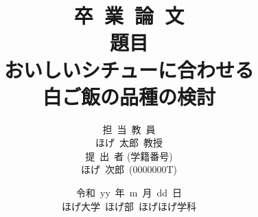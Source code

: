 \title{{\Huge 卒~業~論~文} \\
\vspace{2cm} 題\hspace{1cm}目 \\
\vspace{0.3cm}おいしいシチューに合わせる\\白ご飯の品種の検討\\}
\author{担~当~教~員 \\ ほげ~太郎~教授 \vspace{1cm} \\
        提~出~者 (学籍番号) \\ ほげ~次郎~(0000000T)}
\date{\vspace{2cm}令和~yy~年~m~月~dd~日 \\
\vspace{2cm}ほげ大学~ほげ部~ほげほげ学科}